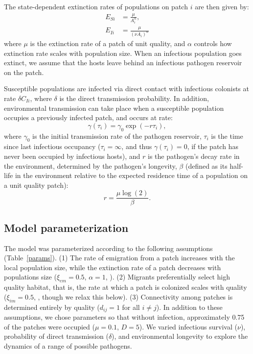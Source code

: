\documentclass{article}
\begin{document}
The state-dependent extinction rates of populations on patch $i$ are then given by:
\begin{align}
E_{Si} & =\frac{\mu}{A_i^\alpha},\\
E_{Ii} & = \frac{\mu}{(\nu A_i) ^ \alpha}
\end{align}
where $\mu$ is the extinction rate of a patch of unit quality, and $\alpha$ controls how extinction rate scales with population size.  When an infectious population goes extinct, we assume that the hosts leave behind an infectious pathogen reservoir on the patch.  

Susceptible populations are infected via direct contact with infectious colonists at rate $\delta C_{Ii}$, where $\delta$ is the direct transmission probability.  In addition, environmental transmission can take place when a susceptible population occupies a previously infected patch, and occurs at rate:
\begin{equation}
\gamma(\tau_i)=\gamma_0\exp \left(-r \tau_{i}\right),
\end{equation}
where $\gamma_0$ is the initial transmission rate of the pathogen reservoir, $\tau_{i}$ is the time since last infectious occupancy ($\tau_{i} = \infty$, and thus $\gamma(\tau_i) = 0$, if the patch has never been occupied by infectious hosts), and $r$ is the pathogen's decay rate in the environment, determined by the pathogen's longevity, $\beta$ (defined as its half-life in the environment relative to the expected residence time of a population on a unit quality patch):
\begin{equation}
r = \frac{\mu \log(2)}{\beta}.
\end{equation}

\subsection{Model parameterization}

The model was parameterized according to the following assumptions (Table~\ref{params}). 
(1) The rate of emigration from a patch increases with the local population size, while the extinction rate of a patch decreases with populations size ($\xi_{em}=0.5$, $\alpha=1$, \cite{Hanski2003}).  
(2) Migrants preferentially select high quality habitat, that is, the rate at which a patch is colonized scales with quality ($\xi_{im}=0.5$, \cite{Hanski2003}, though we relax this below).  
(3)  Connectivity among patches is determined entirely by quality ($d_{ij}=1$ for all $i \neq j$).  
In addition to these assumptions, we chose parameters so that without infection, approximately 0.75 of the patches were occupied ($\mu = 0.1$, $D=5$).  We varied infectious survival ($\nu$), probability of direct transmission ($\delta$), and environmental longevity to explore the dynamics of a range of possible pathogens.
\end{document}
